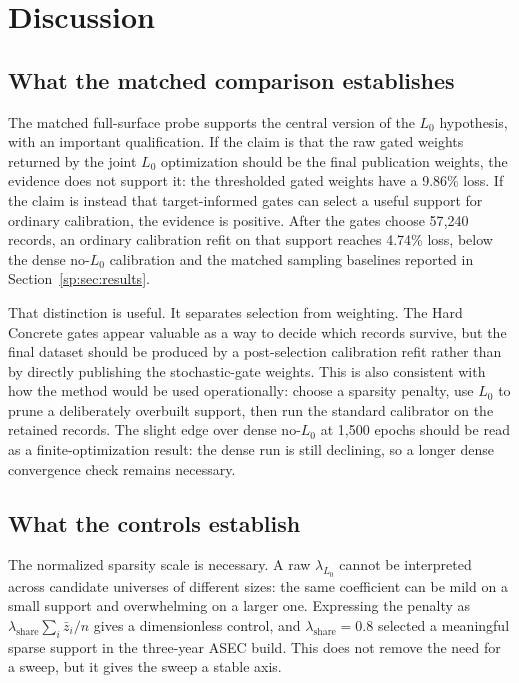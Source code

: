 \section{Discussion}
\label{sp:sec:discussion}

\subsection{What the matched comparison establishes}

The matched full-surface probe supports the central version of the $L_0$ hypothesis, with an important
qualification. If the claim is that the raw gated weights returned by the joint $L_0$ optimization should
be the final publication weights, the evidence does not support it: the thresholded gated weights have a
9.86\% \populace{} loss. If the claim is instead that target-informed gates can select a useful support for
ordinary calibration, the evidence is positive. After the gates choose 57{,}240 records, an ordinary
calibration refit on that support reaches 4.74\% loss, below the dense no-$L_0$ calibration and the
matched sampling baselines reported in Section~\ref{sp:sec:results}.

That distinction is useful. It separates selection from weighting. The Hard Concrete gates appear valuable
as a way to decide which records survive, but the final dataset should be produced by a post-selection
calibration refit rather than by directly publishing the stochastic-gate weights. This is also consistent
with how the method would be used operationally: choose a sparsity penalty, use $L_0$ to prune a
deliberately overbuilt support, then run the standard \populace{} calibrator on the retained records. The
slight edge over dense no-$L_0$ at 1{,}500 epochs should be read as a finite-optimization result: the
dense run is still declining, so a longer dense convergence check remains necessary.

\subsection{What the controls establish}

The normalized sparsity scale is necessary. A raw $\lambda_{L_0}$ cannot be interpreted across candidate
universes of different sizes: the same coefficient can be mild on a small support and overwhelming on a
larger one. Expressing the penalty as
$\lambda_{\mathrm{share}}\sum_i\bar{z}_i/n$ gives a dimensionless control, and
$\lambda_{\mathrm{share}}=0.8$ selected a meaningful sparse support in the three-year ASEC build. This does
not remove the need for a sweep, but it gives the sweep a stable axis.

